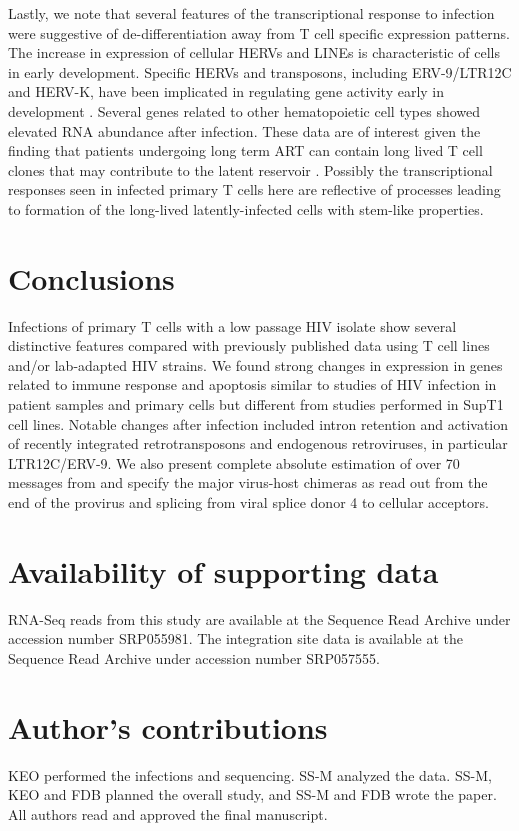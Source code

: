 \documentclass[../sherrill-Mix_thesis.tex]{subfiles}
\begin{document}
	Lastly, we note that several features of the transcriptional response to \hivEight{} infection were suggestive of de-differentiation away from T cell specific expression patterns. The increase in expression of cellular HERVs and LINEs is characteristic of cells in early development. Specific HERVs and transposons, including ERV-9/LTR12C and HERV-K, have been implicated in regulating gene activity early in development \citep{Ling2002,Pi2004,Santoni2012,Fuchs2013,Fort2014,Wang2014}. Several genes related to other hematopoietic cell types showed elevated RNA abundance after \hivEight{} infection. These data are of interest given the finding that patients undergoing long term ART can contain long lived T cell clones that may contribute to the latent reservoir \citep{Joos2008,Brennan2009,Wagner2013,Kearney2014,Cohn2015}.  Possibly the transcriptional responses seen in infected primary T cells here are reflective of processes leading to formation of the long-lived latently-infected cells with stem-like properties.

\section{Conclusions}
	Infections of primary T cells with a low passage HIV isolate show several distinctive features compared with previously published data using T cell lines and/or lab-adapted HIV strains. We found strong changes in expression in genes related to immune response and apoptosis similar to studies of HIV infection in patient samples and primary cells but different from studies performed in SupT1 cell lines. Notable changes after infection included intron retention and activation of recently integrated retrotransposons and endogenous retroviruses, in particular LTR12C/ERV-9. We also present complete absolute estimation of over 70 messages from \hivEight{} and specify the major virus-host chimeras as read out from the \threePrime{} end of the provirus and splicing from viral splice donor 4 to cellular acceptors.


\section{Availability of supporting data}
	RNA-Seq reads from this study are available at the Sequence Read Archive under accession number SRP055981. The integration site data is available at the Sequence Read Archive under accession number SRP057555.

\section{Author's contributions}
	KEO performed the infections and sequencing. SS-M analyzed the data. SS-M, KEO and FDB planned the overall study, and SS-M and FDB wrote the paper. All authors read and approved the final manuscript.
\end{document}
